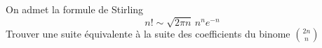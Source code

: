 On admet la formule de Stirling
\[n! \sim \sqrt{2 \pi n}\,n^n e^{-n}\]
Trouver une suite \'equivalente \`a la suite des coefficients du binome $\binom{2n}{n}$ \bigskip